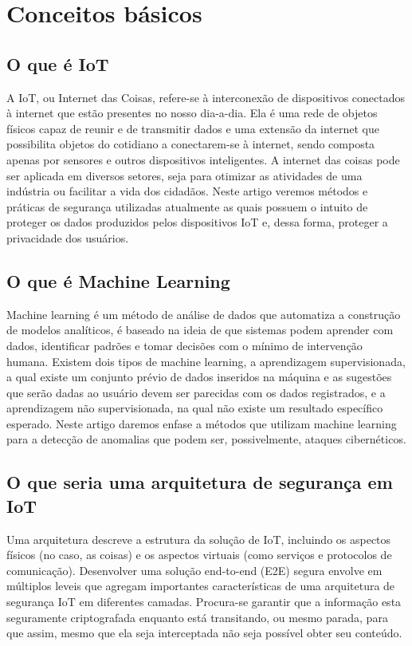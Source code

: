 \documentclass[article]{abntex2}
\begin{document}
\section{Conceitos básicos}
\subsection{O que é IoT}
A IoT, ou Internet das Coisas, refere-se à interconexão de dispositivos conectados à internet que estão presentes no nosso dia-a-dia. Ela é uma rede de objetos físicos capaz de reunir e de transmitir dados e uma extensão da internet que possibilita objetos do cotidiano a conectarem-se à internet, sendo composta apenas por sensores e outros dispositivos inteligentes. A internet das coisas pode ser aplicada em diversos setores, seja para otimizar as atividades de uma indústria ou facilitar a vida dos cidadãos. Neste artigo veremos métodos e práticas de segurança utilizadas atualmente as quais possuem o intuito de proteger os dados produzidos pelos dispositivos IoT e, dessa forma, proteger a privacidade dos usuários.
\subsection{O que é Machine Learning}
Machine learning é um método de análise de dados que automatiza a construção de modelos analíticos, é baseado na ideia de que sistemas podem aprender com dados, identificar padrões e tomar decisões com o mínimo de intervenção humana. Existem dois tipos de machine learning, a aprendizagem supervisionada, a qual existe um conjunto prévio de dados inseridos na máquina e as sugestões que serão dadas ao usuário devem ser parecidas com os dados registrados, e a aprendizagem não supervisionada, na qual não existe um resultado específico esperado. Neste artigo daremos enfase a métodos que utilizam machine learning para a detecção de anomalias que podem ser, possivelmente, ataques cibernéticos.
\subsection{O que seria uma arquitetura de segurança em IoT}
Uma arquitetura descreve a estrutura da solução de IoT, incluindo os aspectos físicos (no caso, as coisas) e os aspectos virtuais (como serviços e protocolos de comunicação). Desenvolver uma solução end-to-end (E2E) segura envolve em múltiplos leveis que agregam importantes características de uma arquitetura de segurança IoT em diferentes camadas. Procura-se garantir que a informação esta seguramente criptografada enquanto está transitando, ou mesmo parada, para que assim, mesmo que ela seja interceptada não seja possível obter seu conteúdo.
\end{document}

